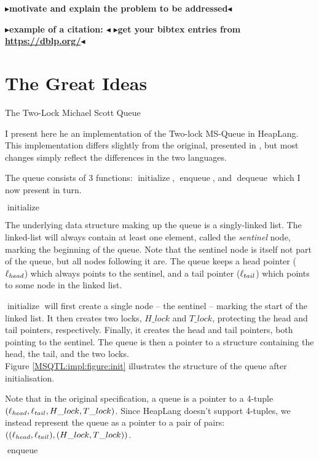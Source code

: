 \documentclass[twoside,11pt,openright]{report}
\newcommand{\initialise}{\operatorname{initialize}}
\newcommand{\enqueue}{\operatorname{enqueue}}
\newcommand{\dequeue}{\operatorname{dequeue}}
\newcommand{\todo}[1]{{\color[rgb]{.5,0,0}\textbf{$\blacktriangleright$#1$\blacktriangleleft$}}}
\begin{document}
\todo{motivate and explain the problem to be addressed}

\todo{example of a citation: \cite{DBLP:conf/podc/MichaelS96}}
\todo{get your bibtex entries from \url{https://dblp.org/}}


\chapter{The Great Ideas}
\label{ch:main}

The Two-Lock Michael Scott Queue

I present here he an implementation of the Two-lock MS-Queue in HeapLang. This implementation differs slightly from the original, presented in \cite{DBLP:conf/podc/MichaelS96}, but most changes simply reflect the differences in the two languages.

The queue consists of 3 functions: $\initialise$, $\enqueue$, and $\dequeue$ which I now present in turn.


$\initialise$

The underlying data structure making up the queue is a singly-linked list. The linked-list will always contain at least one element, called the \emph{sentinel} node, marking the beginning of the queue. Note that the sentinel node is itself not part of the queue, but all nodes following it are. The queue keeps a head pointer ($\ell_{head}$) which always points to the sentinel, and a tail pointer ($\ell_{tail}$) which points to some node in the linked list.

$\initialise$ will first create a single node -- the sentinel -- marking the start of the linked list. It then creates two locks, $H\_lock$ and $T\_lock$, protecting the head and tail pointers, respectively. Finally, it creates the head and tail pointers, both pointing to the sentinel. The queue is then a pointer to a structure containing the head, the tail, and the two locks.\\
Figure \ref{MSQTL:impl:figure:init} illustrates the structure of the queue after initialisation.

Note that in the original specification, a queue is a pointer to a 4-tuple $(\ell_{head}, \ell_{tail}, H\_lock, T\_lock)$. Since HeapLang doesn't support 4-tuples, we instead represent the queue as a pointer to a pair of pairs: $((\ell_{head}, \ell_{tail}), (H\_lock, T\_lock))$.


$\enqueue$
\end{document}
